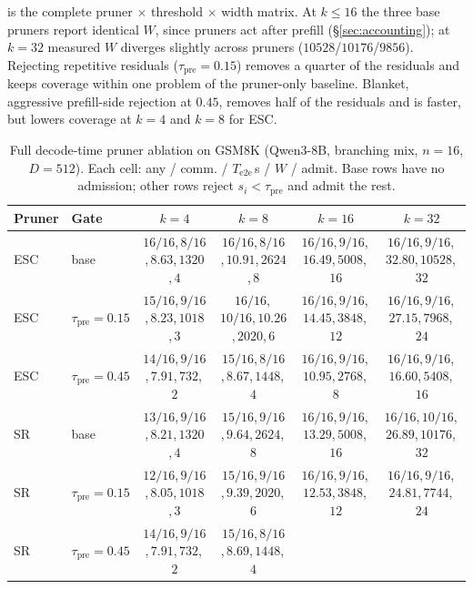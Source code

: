  is the complete pruner $\times$ threshold $\times$ width matrix.
At $k\le16$ the three base pruners report identical $W$, since pruners act after prefill (\S\ref{sec:accounting}); at $k{=}32$ measured $W$ diverges slightly across pruners ($10528$/$10176$/$9856$).
Rejecting repetitive residuals ($\tau_{\mathrm{pre}}{=}0.15$) removes a quarter of the residuals
and keeps coverage within one problem of the pruner-only baseline.
Blanket, aggressive prefill-side rejection at $0.45$, removes half of the residuals and is faster, but
lowers coverage at $k{=}4$ and $k{=}8$ for ESC.

\begin{table}[t]
\centering
\caption{Full decode-time pruner ablation on GSM8K (Qwen3-8B, branching mix, $n{=}16$, $D{=}512$).
Each cell: any / comm. / $T_{\mathrm{e2e}}$\,s / $W$ / admit.
Base rows have no admission; other rows reject $s_i{<}\tau_{\mathrm{pre}}$ and admit the rest.}
\label{tab:ablate-thresh}
\scriptsize
\setlength{\tabcolsep}{1.8pt}
\begin{tabular}{@{}llcccc@{}}
\toprule
Pruner & Gate & $k{=}4$ & $k{=}8$ & $k{=}16$ & $k{=}32$ \\
\midrule
ESC
 & base
 & $16/16$,\,$8/16$,\,$8.63$,\,$1320$,\,$4$
 & $16/16$,\,$8/16$,\,$10.91$,\,$2624$,\,$8$
 & $16/16$,\,$9/16$,\,$16.49$,\,$5008$,\,$16$
 & $16/16$,\,$9/16$,\,$32.80$,\,$10528$,\,$32$ \\
\rowcolor{tblalt}
ESC
 & $\tau_{\mathrm{pre}}{=}0.15$
 & $15/16$,\,$9/16$,\,$8.23$,\,$1018$,\,$3$
 & $16/16$,\,$10/16$,\,$10.26$,\,$2020$,\,$6$
 & $16/16$,\,$9/16$,\,$14.45$,\,$3848$,\,$12$
 & $16/16$,\,$9/16$,\,$27.15$,\,$7968$,\,$24$ \\
ESC
 & $\tau_{\mathrm{pre}}{=}0.45$
 & $14/16$,\,$9/16$,\,$7.91$,\,$732$,\,$2$
 & $15/16$,\,$8/16$,\,$8.67$,\,$1448$,\,$4$
 & $16/16$,\,$9/16$,\,$10.95$,\,$2768$,\,$8$
 & $16/16$,\,$9/16$,\,$16.60$,\,$5408$,\,$16$ \\
\midrule
SR
 & base
 & $13/16$,\,$9/16$,\,$8.21$,\,$1320$,\,$4$
 & $15/16$,\,$9/16$,\,$9.64$,\,$2624$,\,$8$
 & $16/16$,\,$9/16$,\,$13.29$,\,$5008$,\,$16$
 & $16/16$,\,$10/16$,\,$26.89$,\,$10176$,\,$32$ \\
\rowcolor{tblalt}
SR
 & $\tau_{\mathrm{pre}}{=}0.15$
 & $12/16$,\,$9/16$,\,$8.05$,\,$1018$,\,$3$
 & $15/16$,\,$9/16$,\,$9.39$,\,$2020$,\,$6$
 & $16/16$,\,$9/16$,\,$12.53$,\,$3848$,\,$12$
 & $16/16$,\,$9/16$,\,$24.81$,\,$7744$,\,$24$ \\
SR
 & $\tau_{\mathrm{pre}}{=}0.45$
 & $14/16$,\,$9/16$,\,$7.91$,\,$732$,\,$2$
 & $15/16$,\,$8/16$,\,$8.69$,\,$1448$,\,$4$

\end{tabular}
\end{table}
